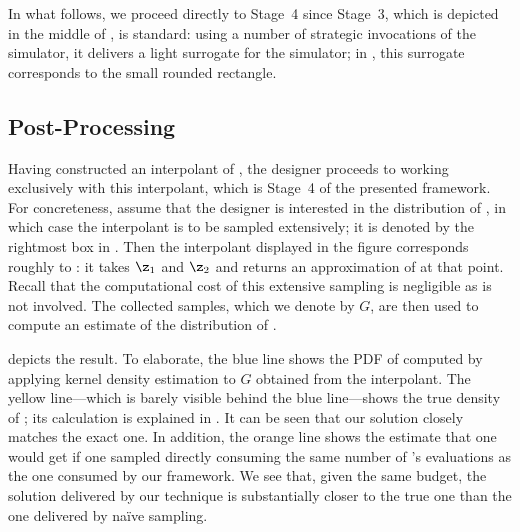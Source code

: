 In what follows, we proceed directly to Stage~4 since Stage~3, which is depicted
in the middle of , is standard: using a number of
strategic invocations of the simulator, it delivers a light surrogate for the
simulator; in , this surrogate corresponds to the small
rounded rectangle.

\subsection{Post-Processing}

Having constructed an interpolant of \g, the designer proceeds to working
exclusively with this interpolant, which is Stage~4 of the presented framework.
For concreteness, assume that the designer is interested in the distribution of
\g, in which case the interpolant is to be sampled extensively; it is denoted by
the rightmost box in . Then the interpolant displayed in
the figure corresponds roughly to : it takes $\z_1$ and
$\z_2$ and returns an approximation of \g at that point. Recall that the
computational cost of this extensive sampling is negligible as \g is not
involved. The collected samples, which we denote by $G$, are then used to
compute an estimate of the distribution of \g.

 depicts the result. To elaborate, the blue line shows the
\ac{PDF} of \g computed by applying kernel density estimation to $G$ obtained
from the interpolant. The yellow line---which is barely visible behind the blue
line---shows the true density of \g; its calculation is explained in
. It can be seen that our solution closely matches the exact
one. In addition, the orange line shows the estimate that one would get if one
sampled \g directly consuming the same number of \g's evaluations as the one
consumed by our framework. We see that, given the same budget, the solution
delivered by our technique is substantially closer to the true one than the one
delivered by naïve sampling.
